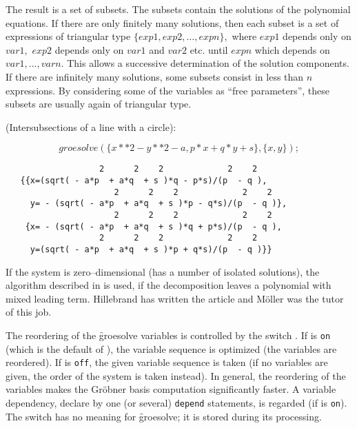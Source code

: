 The result is a set of subsets. The subsets contain the solutions of the
polynomial equations. If there are only finitely many solutions,
then each subset is a set of expressions of triangular type
$\{exp1, exp2,\ldots , expn\},$ where $exp1$ depends only on
$var1,$ $exp2$ depends only on $var1$ and $var2$ etc. until $expn$ which
depends on $var1,\ldots,varn.$ This allows a successive determination of
the solution components. If there are infinitely many solutions,
some subsets consist in less than $n$ expressions. By considering some
of the variables as ``free parameters'',  these subsets are usually
again of triangular type.

\example (Intersubsections of a line with a circle):

\[ groesolve(\{x**2 - y**2 - a, p*x+q*y+s\},\{x,y\}); \]

\begin{verbatim}
                   2      2    2             2    2
   {{x=(sqrt( - a*p  + a*q  + s )*q - p*s)/(p  - q ),
                      2      2    2             2    2
     y= - (sqrt( - a*p  + a*q  + s )*p - q*s)/(p  - q )},
                      2      2    2             2    2
    {x= - (sqrt( - a*p  + a*q  + s )*q + p*s)/(p  - q ),
                   2      2    2             2    2
     y=(sqrt( - a*p  + a*q  + s )*p + q*s)/(p  - q )}}
\end{verbatim}

If the system is zero--dimensional (has a number of isolated solutions),
the algorithm described in \cite{Hillebrand:99} is used, if the decomposition
leaves a polynomial with mixed leading term. Hillebrand has written the
article and M\"oller was the tutor of this job.

The reordering of the \f{groesolve} variables is controlled by the
\REDUCE switch . If  is \texttt{on} (which is the default
of ), the variable sequence is optimized (the variables are reordered).
If  is \texttt{off}, the given variable sequence is taken (if no variables
are given, the order of the \REDUCE system is taken instead). In general, the
reordering of the variables makes the Gr\"obner basis computation
significantly faster.
A variable dependency, declare by one (or several) \texttt{depend} statements,
is regarded (if  is \texttt{on}). The switch  has no meaning
for \f{groesolve}; it is stored during its processing.

